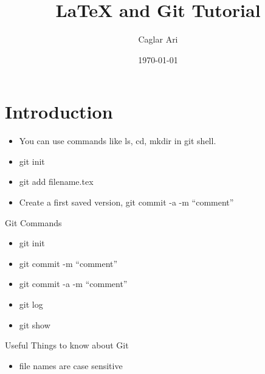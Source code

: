 \documentclass[12pt]{article}
\begin{document}
\title{\LaTeX\; and Git Tutorial}
\author{Caglar Ari}
\date{\today}
\maketitle
{}

\section{Introduction}
\begin{itemize}
\item You can use commands like ls, cd, mkdir in git shell.
\item git init
\item git add filename.tex
\item Create a first saved version, git commit -a -m "`comment"'
\end{itemize}

Git Commands
\begin{itemize}
\item git init
\item git commit -m "`comment"'
\item git commit -a -m "`comment"'
\item git log
\item git show
\end{itemize}

Useful Things to know about Git
\begin{itemize}
\item file names are case sensitive
\end{itemize}
\end{document}
